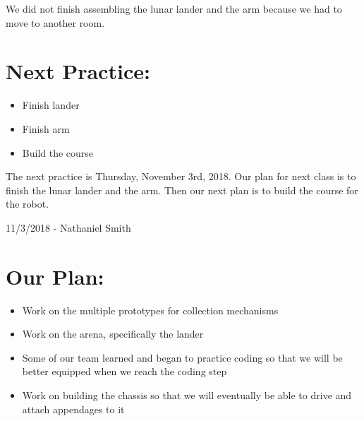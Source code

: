 \documentclass[12pt]{article}
\begin{document}

We did not finish assembling the lunar lander and the arm because we had to move to  another room. 

\section{Next Practice:}
\begin{itemize}
	\item Finish lander
	\item Finish arm
	\item Build the course
\end{itemize}

The next practice is Thursday, November 3rd, 2018. Our plan for next class is to finish the lunar lander and the arm. Then our next plan is to build the course for the robot. 

\newpage
\setcounter{section}{0}

11/3/2018 - Nathaniel Smith 

\section{Our Plan:} %
\begin{itemize}
	\item Work on the multiple prototypes for collection mechanisms
	\item Work on the arena, specifically the lander
\item Some of our team learned and began to practice coding so that we will be better equipped when we reach the coding step
\item Work on building the chassis so that we will eventually be able to drive and attach appendages to it
\end{itemize}
\end{document}
